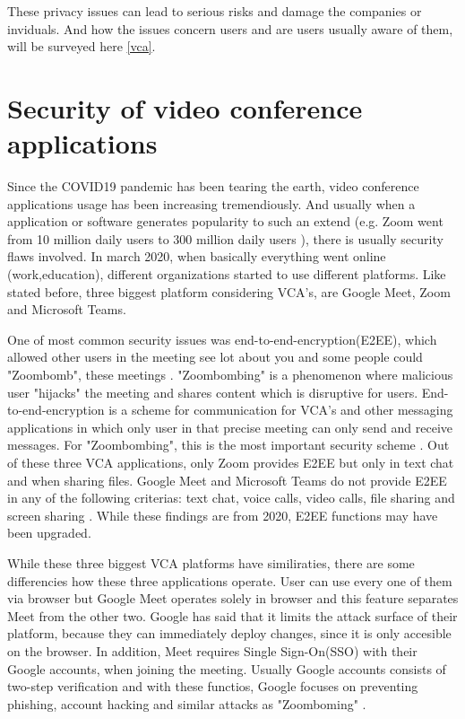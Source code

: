 \documentclass[utf8,english]{gradu3}
\begin{document}
These privacy issues can lead to serious risks and damage the companies or inviduals. And how the issues concern users and are users usually aware of them, will be surveyed here \ref{vca}.

\section{Security of video conference applications}
Since the COVID19 pandemic has been tearing the earth, video conference applications usage has been increasing tremendiously. And usually when a application or software generates popularity to such an extend (e.g. Zoom went from 10 million daily users to 300 million daily users \parencite{goneWrongZoom}), there is usually security flaws involved. 
In march 2020, when basically everything went online (work,education), different organizations started to use different platforms. Like stated before, three biggest platform considering VCA's, are Google Meet, Zoom and Microsoft Teams.

One of most common security issues was end-to-end-encryption(E2EE), which allowed other users in the meeting see lot about you and some people could "Zoombomb", these meetings \parencite{goneWrongZoom}. "Zoombombing" is a phenomenon where malicious user "hijacks" the meeting and shares content which is disruptive for users. End-to-end-encryption is a scheme for communication for VCA's and other messaging applications in which only user in that precise meeting can only send and receive messages. For "Zoombombing", this is the most important security scheme \parencite{e2eeZoom}.
Out of these three VCA applications, only Zoom provides E2EE but only in text chat and when sharing files. Google Meet and Microsoft Teams do not provide E2EE in any of the following criterias: text chat, voice calls, video calls, file sharing and screen sharing \parencite{safetyOfVca}. While these findings are from 2020, E2EE functions may have been upgraded.

While these three biggest VCA platforms have similiraties, there are some differencies how these three applications operate. User can use every one of them via browser but Google Meet operates solely in browser and this feature separates Meet from the other two. Google has said that it limits the attack surface of their platform, because they can immediately deploy changes, since it is only accesible on the browser. In addition, Meet requires Single Sign-On(SSO) with their Google accounts, when joining the meeting. Usually Google accounts consists of two-step verification and with these functios, Google focuses on preventing phishing, account hacking and similar attacks as "Zoomboming" \parencite{dynamicSecurityAnalysis}.
\end{document}
